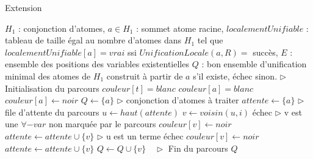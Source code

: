 \begin{center}
\begin{algorithm}[H]
\caption{Extension}\label{algo_extension}
\begin{algorithmic}[1]
\REQUIRE	$H_{1}$ : conjonction d'atomes, 
			$a \in H_{1}$ : sommet atome racine, 
			$localementUnifiable$ : tableau de taille \'egal au nombre d'atomes dans
			$H_{1}$ tel que $localementUnifiable[a] = vrai$ ssi $UnificationLocale(a,R) =$ succ\`es, 
			$E$ : ensemble des positions des variables existentielles
\ENSURE $Q$ : bon ensemble d'unification minimal des atomes de ${H_1}$ construit \`a partir de $a$ s'il existe, \'echec sinon.
\STATE $\triangleright$ Initialisation du parcours
{}
			\STATE $couleur[t] = blanc$
		\ENDFOR
		\STATE $couleur[a] = blanc$
	\ENDIF
\ENDFOR
\STATE $couleur[a] \leftarrow noir$
\STATE $Q \leftarrow \{a\}$   $\triangleright$ conjonction d'atomes \`a traiter
\STATE $attente \leftarrow \{a\}$   $\triangleright$ file d'attente du parcours
	\STATE $u \leftarrow haut(attente)$
			\STATE $v \leftarrow voisin(u,i)$
				\RETURN \'echec	
				\STATE $\triangleright$ v est une $\forall-var$ non marqu\'ee par le parcours
				\STATE $couleur[v] \leftarrow noir$
				\STATE $attente \leftarrow attente \cup \{v\}$
			\ENDIF
		\ENDFOR
	\ELSE
		\STATE $\triangleright$ u est un terme
				\RETURN \'echec
			\ELSE
					\STATE $couleur[v] \leftarrow noir$
					\STATE $attente \leftarrow attente \cup \{v\}$
					\STATE $Q \leftarrow Q \cup \{v\}$
				\ENDIF
			\ENDIF
		\ENDFOR
	\ENDIF
\ENDWHILE $\ \ \ \triangleright$ Fin du parcours
\RETURN $Q$
\end{algorithmic}
\end{algorithm}
\end{center}

